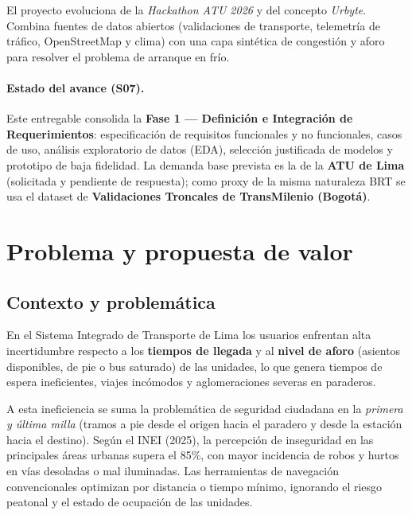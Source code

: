 \documentclass[11pt]{article}
\begin{document}
El proyecto evoluciona de la \emph{Hackathon ATU 2026} y del concepto \emph{Urbyte}. Combina fuentes
de datos abiertos (validaciones de transporte, telemetría de tráfico, OpenStreetMap y clima) con una
capa sintética de congestión y aforo para resolver el problema de arranque en frío.

\paragraph{Estado del avance (S07).} Este entregable consolida la \textbf{Fase 1 --- Definición e
Integración de Requerimientos}: especificación de requisitos funcionales y no funcionales, casos de
uso, análisis exploratorio de datos (EDA), selección justificada de modelos y prototipo de baja
fidelidad. La demanda base prevista es la de la \textbf{ATU de Lima} (solicitada y pendiente de
respuesta); como proxy de la misma naturaleza BRT se usa el dataset de \textbf{Validaciones
Troncales de TransMilenio (Bogotá)}.

\section{Problema y propuesta de valor}
\label{sec:problema}
\subsection{Contexto y problemática}
En el Sistema Integrado de Transporte de Lima los usuarios enfrentan alta incertidumbre respecto a
los \textbf{tiempos de llegada} y al \textbf{nivel de aforo} (asientos disponibles, de pie o bus
saturado) de las unidades, lo que genera tiempos de espera ineficientes, viajes incómodos y
aglomeraciones severas en paraderos.

A esta ineficiencia se suma la problemática de seguridad ciudadana en la \emph{primera y última
milla} (tramos a pie desde el origen hacia el paradero y desde la estación hacia el destino). Según
el INEI (2025), la percepción de inseguridad en las principales áreas urbanas supera el 85\%, con
mayor incidencia de robos y hurtos en vías desoladas o mal iluminadas. Las herramientas de
navegación convencionales optimizan por distancia o tiempo mínimo, ignorando el riesgo peatonal y el
estado de ocupación de las unidades.
\end{document}
